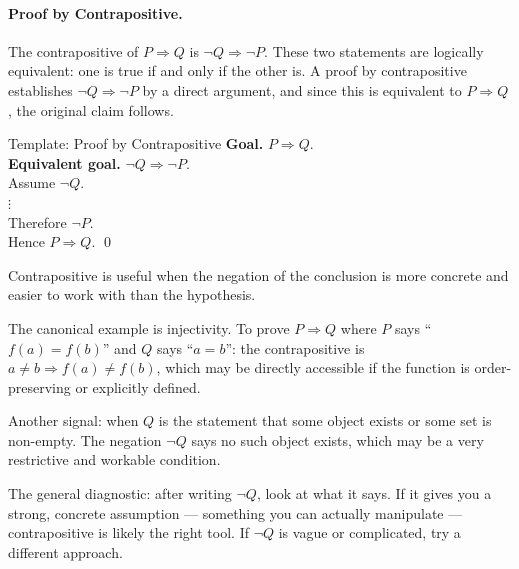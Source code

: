 \paragraph{Proof by Contrapositive.}

The contrapositive of $P \Rightarrow Q$ is $\neg Q \Rightarrow \neg P$.
These two statements are logically equivalent: one is true if and only
if the other is. A proof by contrapositive establishes
$\neg Q \Rightarrow \neg P$ by a direct argument, and since this is
equivalent to $P \Rightarrow Q$, the original claim follows.

\begin{propositionbox}{Template: Proof by Contrapositive}
\textbf{Goal.} $P \Rightarrow Q$.\\
\textbf{Equivalent goal.} $\neg Q \Rightarrow \neg P$.\\[4pt]
Assume $\neg Q$.\\
$\vdots$ \\
Therefore $\neg P$.\\
Hence $P \Rightarrow Q$. \qed
\end{propositionbox}

\begin{remark}
Contrapositive is useful when the negation of the conclusion is more
concrete and easier to work with than the hypothesis.

The canonical example is injectivity. To prove $P \Rightarrow Q$ where
$P$ says ``$f(a) = f(b)$'' and $Q$ says ``$a = b$'': the contrapositive
is $a \neq b \Rightarrow f(a) \neq f(b)$, which may be directly
accessible if the function is order-preserving or explicitly defined.

Another signal: when $Q$ is the statement that some object exists or
some set is non-empty. The negation $\neg Q$ says no such object
exists, which may be a very restrictive and workable condition.

The general diagnostic: after writing $\neg Q$, look at what it says.
If it gives you a strong, concrete assumption --- something you can
actually manipulate --- contrapositive is likely the right tool.
If $\neg Q$ is vague or complicated, try a different approach.
\end{remark}

